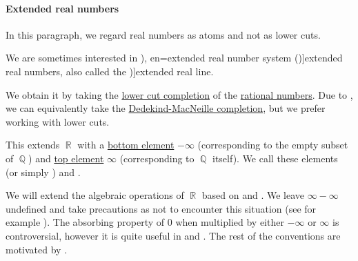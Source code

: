 \paragraph{Extended real numbers}\hfill

In this paragraph, we regard real numbers as atoms and not as lower cuts.

\begin{definition}\label{def:extended_real_numbers}\mimprovised
  We are sometimes interested in \term[ru=расширенная вещественная прямая (\cite[23]{ИоффеТихомиров1974ЭкстремальныеЗадачи}), en=extended real number system (\cite[10]{Folland1999RealAnalysis})]{extended real numbers}, also called the \term[en=extended real line (\cite[\S 1.4]{Rudin1987RealAndComplexAnalysis})]{extended real line}.

  We obtain it by taking the \hyperref[def:lower_cut_completion]{ lower cut completion} of the \hyperref[def:rational_numbers]{rational numbers}. Due to , we can equivalently take the \hyperref[def:dedekind_macnielle_completion]{Dedekind-MacNeille completion}, but we prefer working with lower cuts.

  This extends \( \BbbR \) with a \hyperref[def:extremal_points/top_and_bottom]{bottom element} \( -\infty \) (corresponding to the empty subset of \( \BbbQ \)) and \hyperref[def:extremal_points/top_and_bottom]{top element} \( \infty \) (corresponding to \( \BbbQ \) itself). We call these elements  (or simply ) and .

  We will extend the algebraic operations of \( \BbbR \) based on \cite[\S 1.1.17]{Schechter1997AnalysisHandbook} and \cite[11]{Folland1999RealAnalysis}. We leave \( \infty - \infty \) undefined and take precautions as not to encounter this situation (see for example ). The absorbing property of \( 0 \) when multiplied by either \( -\infty \) or \( \infty \) is controversial, however it is quite useful in  and . The rest of the conventions are motivated by .


\end{definition}
